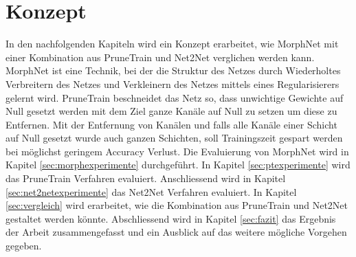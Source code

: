 \begin{figure}
     \centering
     \caption{}
     \label{abb:BaseAccS}
\end{figure}


\color{black}

\section{Konzept}\label{sec:konzept}

In den nachfolgenden Kapiteln wird ein Konzept erarbeitet, wie MorphNet mit einer Kombination aus PruneTrain und Net2Net verglichen werden kann. MorphNet ist eine Technik, bei der die Struktur des Netzes durch Wiederholtes Verbreitern des Netzes und Verkleinern des Netzes mittels eines Regularisierers gelernt wird.
PruneTrain beschneidet das Netz so, dass unwichtige Gewichte auf Null gesetzt werden mit dem Ziel ganze Kanäle auf Null zu setzen um diese zu Entfernen. Mit der Entfernung von Kanälen und falls alle Kanäle einer Schicht auf Null gesetzt wurde auch ganzen Schichten, soll Trainingszeit gespart werden bei möglichst geringem Accuracy Verlust.
\color{blue1}
Die Evaluierung von MorphNet wird in Kapitel \ref{sec:morphexperimente} durchgeführt. In Kapitel \ref{sec:ptexperimente} wird das PruneTrain Verfahren evaluiert.  Anschliessend wird in Kapitel \ref{sec:net2netexperimente} das Net2Net Verfahren evaluiert. In Kapitel \ref{sec:vergleich} wird erarbeitet, wie die Kombination aus PruneTrain und Net2Net gestaltet werden könnte. Abschliessend wird in Kapitel \ref{sec:fazit} das Ergebnis der Arbeit zusammengefasst und ein Ausblick auf das weitere mögliche Vorgehen gegeben.

\color{black}




